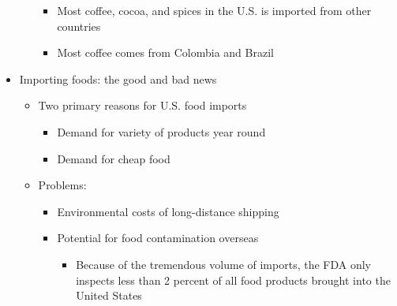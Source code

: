\documentclass[12pt]{article}
\begin{document}
\begin{itemize}
\begin{itemize}
\begin{itemize}
                                \item Most coffee, cocoa, and spices in the U.S. is imported from other countries
                                \item Most coffee comes from Colombia and Brazil
                            \end{itemize}
                    \end{itemize}
                \item Importing foods: the good and bad news
                    \begin{itemize}
                        \item Two primary reasons for U.S. food imports
                            \begin{itemize}
                                \item Demand for variety of products year round
                                \item Demand for cheap food
                            \end{itemize}
                        \item Problems:
                            \begin{itemize}
                                \item Environmental costs of long-distance shipping
                                \item Potential for food contamination overseas
                                    \begin{itemize}
                                        \item Because of the tremendous volume of imports, the FDA only inspects less than 2 percent of all food products brought into the United States
                                    \end{itemize}
                            \end{itemize}
                    \end{itemize}
            \end{itemize}
\end{document}
